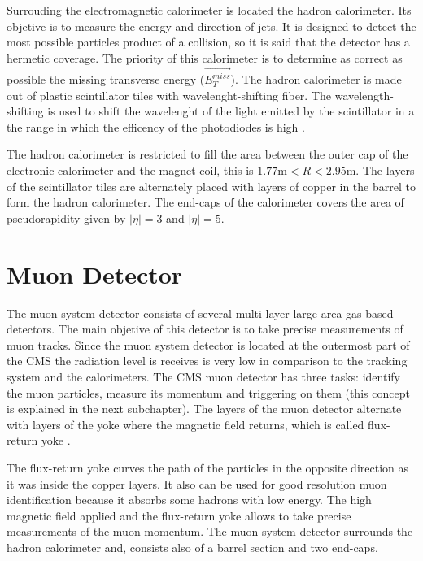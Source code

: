Surrouding the electromagnetic calorimeter is located the hadron calorimeter. Its objetive is to measure the energy and direction of jets. It is designed to detect the most possible particles product of a collision, so it is said that the detector has a hermetic coverage. The priority of this calorimeter is to determine as correct as possible the missing transverse energy ($\vec{E_T^{miss}}$). The hadron calorimeter is made out of plastic scintillator tiles with wavelenght-shifting fiber. The wavelength-shifting is used to shift the wavelenght of the light emitted by the scintillator in a the range in which the efficency of the photodiodes is high \cite{Perspectives_LHC}.

The hadron calorimeter is restricted to fill the area between the outer cap of the electronic calorimeter and the magnet coil, this is $1.77 \text{m} < R < 2.95\text{m}$. The layers of the scintillator tiles are alternately placed with layers of copper in the barrel to form the hadron calorimeter. The end-caps of the calorimeter covers the area of pseudorapidity given by $|\eta|= 3$ and $|\eta|= 5$.


\section{Muon Detector}

The muon system detector consists of several multi-layer large area gas-based detectors. The main objetive of this detector is to take precise measurements of muon tracks. Since the muon system 
detector is located at the outermost part of the CMS the radiation level is receives is very low in comparison to the tracking system and the calorimeters. The CMS muon detector has three tasks: 
identify the muon particles, measure its momentum and triggering on them (this concept is explained in the next subchapter). The layers of the muon detector alternate with layers of the yoke where 
the magnetic field returns, which is called flux-return yoke \cite{Perspectives_LHC}. 

The flux-return yoke curves the path of the particles in the opposite direction as it was inside the copper layers. It also can be used for good resolution muon identification because it absorbs 
some hadrons with low energy. The high magnetic field applied and the flux-return yoke allows to take precise measurements of the muon momentum. The muon system detector surrounds the hadron
calorimeter and, consists also of a barrel section and two end-caps. 

